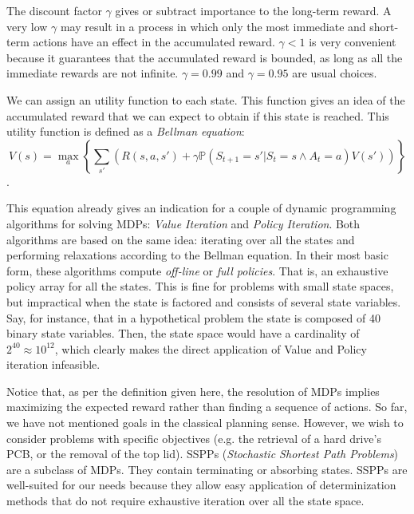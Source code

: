 \documentclass[../root.tex]{subfiles}
\begin{document}
The discount factor $ \gamma $ gives or subtract importance
to the long-term reward. A very low $ \gamma $ may result in a process in which
only the most immediate and short-term actions have an effect in the
accumulated reward. $ \gamma < 1 $ is very convenient because it guarantees
that the accumulated reward is bounded, as long as all the immediate rewards
are not infinite. $ \gamma = 0.99 $ and $ \gamma = 0.95 $ are usual choices.

We can assign an utility function to each state. This function gives an
idea of the accumulated reward that we can expect to obtain if this state
is reached. This utility function is defined as a \emph{Bellman equation}:
\[ V(s) = \max_a \left\{ \sum_{s'} \left( R(s, a, s') + \gamma \mathbb{P}(S_{t+1} = s' | S_t = s \land A_t=a) V(s') \right) \right\} \].

This equation already gives an indication for a couple of dynamic programming
algorithms for solving MDPs: \emph{Value Iteration} and \emph{Policy Iteration}.
Both algorithms are based on the same idea: iterating over all the states and
performing relaxations according to the Bellman equation. In their most
basic form, these algorithms compute \emph{off-line} or \emph{full policies}.
That is, an exhaustive policy array for all the states. This is
fine for problems with small state spaces, but impractical when the state
is factored and consists of several state variables. Say, for instance, that
in a hypothetical problem the state is composed of 40 binary state variables.
Then, the state space would have a cardinality of $ 2^{40} \approx 10^{12} $, which
clearly makes the direct application of Value and Policy iteration
infeasible.

Notice that, as per the definition given here, the resolution of MDPs
implies maximizing the expected reward rather than finding a sequence of actions.
So far, we have not mentioned goals in the classical planning sense.
However, we wish to consider
problems with specific objectives (e.g. the retrieval of a hard drive's PCB,
or the removal of the top lid). SSPPs (\emph{Stochastic Shortest Path Problems})
are a subclass of MDPs. They contain terminating or absorbing states.
SSPPs
are well-suited for our needs because they allow easy application of determinization
methods that do not require exhaustive iteration over all the state space.
\end{document}

